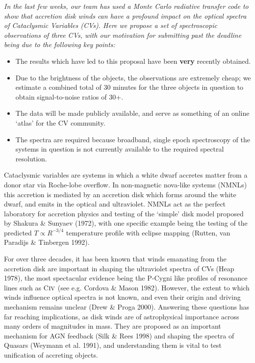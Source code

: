 {\it In the last few weeks, our team has used a Monte Carlo radiative transfer
code to show that accretion disk winds can have a profound impact on the optical spectra of Cataclysmic Variables (CVs). Here we propose a set of spectroscopic observations of three CVs, 
with our motivation for submitting past the deadline being due to the following key points:

\begin{itemize}
\item The results which have led to this proposal have been {\bf very} recently obtained.
\item Due to the brightness of the objects, the observations are extremely cheap; we estimate a combined total of 30 minutes for the three objects in question to obtain signal-to-noise ratios of 30+. 
\item The data will be made publicly available, and serve as something of an online `atlas' for the CV community.
\item The spectra are required because broadband, single epoch spectroscopy of the systems in question is not currently available to the required spectral resolution.
\end{itemize}
}
\bigskip



Cataclysmic variables are systems in which a white dwarf accretes matter from a donor
star via Roche-lobe overflow. In non-magnetic nova-like systems (NMNLs) this accretion
is mediated by an accretion disk which forms around the white dwarf, and emits in the optical
and ultraviolet. NMNLs act as the perfect laboratory for accretion physics 
and testing of the `simple' disk model proposed by Shakura \& Sunyaev (1972), with one
specific example being the testing of the predicted $T\propto R^{-3/4}$ temperature 
profile with eclipse mapping (Rutten, van
Paradijs \& Tinbergen 1992).
\bigskip


For over three decades, it has been known that winds emanating from the accretion disk
are important in shaping the ultraviolet spectra of CVs (Heap 1978), 
the most spectacular evidence being the P-Cygni like profiles of resonance lines such as 
C${\textsc {iv}}$ (see e.g. Cordova \& Mason 1982). 
However, the extent to which winds influence optical spectra is not known, and even their origin 
and driving mechanism remains unclear (Drew \& Proga 2000). 
Answering these questions has far reaching implications, as
disk winds are of astrophysical importance across many orders of magnitudes in mass.
They are proposed as an important mechanism for AGN feedback (Silk \& Rees 1998) and shaping 
the spectra of Quasars (Weymann et al. 1991), and understanding them is vital to test
unification of accreting objects.

